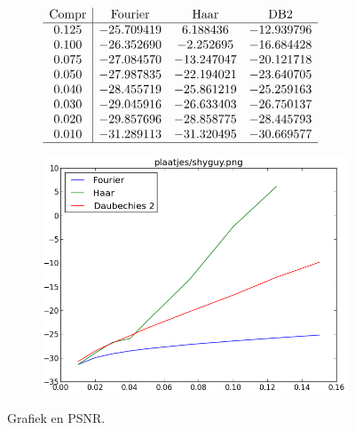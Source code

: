 \documentclass[11pt]{report}
\theoremstyle{plain}
\theoremstyle{remark}
\begin{document}
\begin{figure}
	\centering
	\begin{subfigure}[t]{0.48\textwidth}
	\centering
	\vspace{10pt}
	\begingroup
	
\renewcommand*{\arraystretch}{1.5}
	$\begin{array}{c | c c c c}
	\text{Compr} & \text{Fourier} & \text{Haar} & \text{DB2} \\ \hline
0.125 & -25.709419 & 6.188436 & -12.939796 \\
0.100 & -26.352690 & -2.252695 & -16.684428 \\
0.075 & -27.084570 & -13.247047 & -20.121718 \\
0.050 & -27.987835 & -22.194021 & -23.640705 \\
0.040 & -28.455719 & -25.861219 & -25.259163 \\
0.030 & -29.045916 & -26.633403 & -26.750137 \\
0.020 & -29.857696 & -28.858775 & -28.445793 \\
0.010 & -31.289113 & -31.320495 & -30.669577 \\ \hline
	\end{array}$
	\endgroup
	\end{subfigure}	
	\begin{subfigure}[t]{0.48\textwidth}
		\centering
		\vspace{0pt}
		\includegraphics[height=\textwidth]{plaatjes/grafiek_shyguy_0_15-0_01.png}
	\end{subfigure}
	\caption{Grafiek en PSNR.}
\end{figure}
\restoregeometry
\pagebreak
\end{document}
